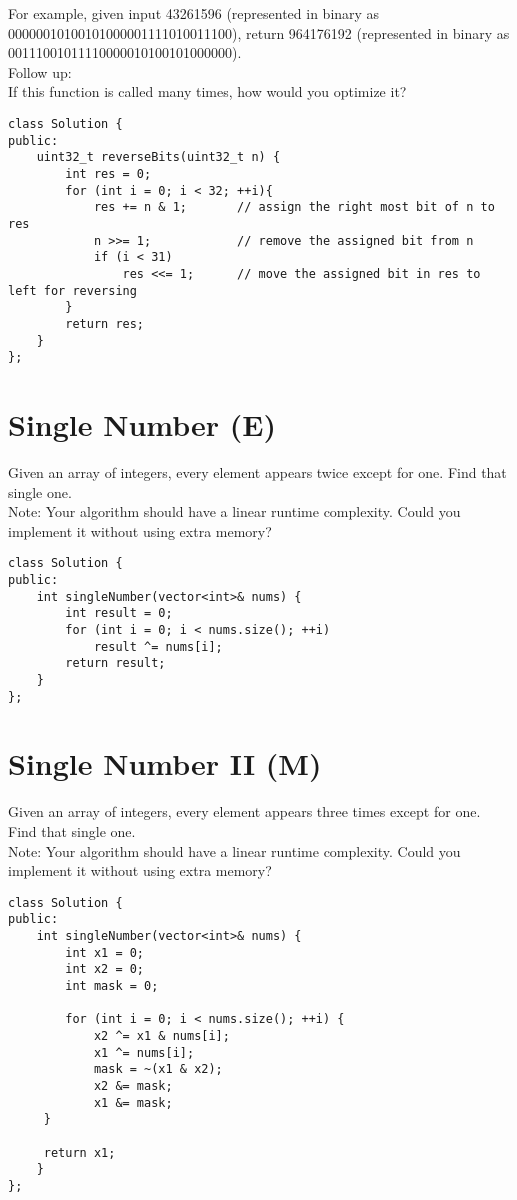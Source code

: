 For example, given input 43261596 (represented in binary as 00000010100101000001111010011100), return 964176192 (represented in binary as 00111001011110000010100101000000).\\

Follow up:\\
If this function is called many times, how would you optimize it? \\

\begin{lstlisting}
class Solution {
public:
    uint32_t reverseBits(uint32_t n) {
        int res = 0;
        for (int i = 0; i < 32; ++i){
            res += n & 1;       // assign the right most bit of n to res
            n >>= 1;            // remove the assigned bit from n
            if (i < 31)
                res <<= 1;      // move the assigned bit in res to left for reversing
        }
        return res;
    }
};
\end{lstlisting}


\section{Single Number (E)}
Given an array of integers, every element appears twice except for one. Find that single one.\\

Note: Your algorithm should have a linear runtime complexity. Could you implement it without using extra memory? \\

\begin{lstlisting}
class Solution {
public:
    int singleNumber(vector<int>& nums) {
        int result = 0;
        for (int i = 0; i < nums.size(); ++i)
            result ^= nums[i];
        return result;
    }
};
\end{lstlisting}


\section{Single Number II (M)}
Given an array of integers, every element appears three times except for one. Find that single one. \\

Note: Your algorithm should have a linear runtime complexity. Could you implement it without using extra memory? \\

\begin{lstlisting}
class Solution {
public:
    int singleNumber(vector<int>& nums) {
        int x1 = 0;   
        int x2 = 0; 
        int mask = 0;

        for (int i = 0; i < nums.size(); ++i) {
            x2 ^= x1 & nums[i];
            x1 ^= nums[i];
            mask = ~(x1 & x2);
            x2 &= mask;
            x1 &= mask;
     }

     return x1;
    }
};
\end{lstlisting}


